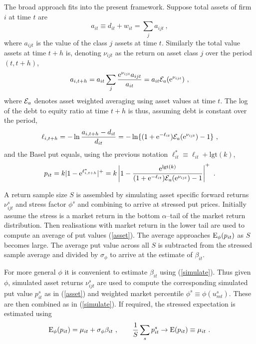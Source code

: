\documentclass[authoryear]{elsarticle}
\newcommand{\logit}{\mathrm{lgt}}
\newcommand{\E}{\mathrm{E}}
\newcommand{\e}{\mathrm{e}}
\newcommand{\Ex}{{\cal E}}
\newcommand{\eref}[1]{(\ref{#1})}
\newcommand{\cq}{\ , \qquad}
\newcommand{\be}[1]{\begin{equation}\label{#1}}
\newcommand{\ee}{\end{equation}}
\begin{document}
The broad approach fits into the present framework.   Suppose total assets of firm $i$ at time $t$ are
$$
a_{it}\equiv d_{it}+w_{it}  = \sum_j a_{ijt} \ ,
$$
where  $a_{ijt}$ is the value of the class  $j$ assets at time $t$.   Similarly the total value assets at time $t+h$ is, denoting $\nu_{ijt}$ as the return on asset class $j$ over the period $(t,t+h)$, 
$$
 a_{i,t+h} = a_{it}\sum_j \frac{\e^{\nu_{ijt}}a_{ijt}}{a_{it}} = a_{it}\Ex_a(\e^{\nu_{ijt}})\ ,
$$
where $\Ex_a$ denotes asset weighted averaging using asset values at time $t$.
The log of the debt to equity ratio at time $t+h$ is thus, assuming debt is constant over the period,
$$
\ell_{i,t+h} = -\ln \frac{a_{i,t+h}-d_{it}}{d_{it}} = -\ln\{(1+\e^{-\ell_{it}})\Ex_a(\e^{\nu_{ijt}})-1\}\ ,
$$
and the Basel put equals, using the previous notation $\ell_{it}^*\equiv\ell_{it}+\logit(k)$,
\be{asset}
p_{it} = k|1-\e^{\ell^*_{i,t+h}}|^+ = k\left|1-\frac{\e^{\logit(k)}}{(1+\e^{-\ell_{it}})\Ex_a(\e^{\nu_{ijt}})-1}\right|^+ \ .
\ee

A return sample size $S$ is assembled by simulating asset specific forward returns $\nu^s_{ijt}$ and  stress factor $\phi^s$ and combining to arrive at stressed put prices.   Initially assume the stress  is a market return in the bottom $\alpha$--tail of the market return  distribution.   Then realisations with market return in the lower tail  are used to compute an average  of put values \eref{asset}.  The average approaches $\Es(p_{it})$ as $S$ becomes large.   The average put value across all $S$ is  subtracted from the stressed sample average and divided by $\sigma_\phi$  to arrive at the estimate of $\beta_{it}$. 

For more general $\phi$ it is  convenient to estimate $\beta_{it}$ using \eref{simulate}.   Thus given $\phi$, simulated asset returns $\nu_{ijt}^s$ are used to compute the corresponding simulated put value $p_{it}^s$ as in \eref{asset} and weighted market percentile $\phi^s\equiv \phi(u^s_{mt})$.   These are then combined as in \eref{simulate}.   If required, the stressed expectation is estimated using 
$$
\Es(p_{it}) = \mu_{it} + \sigma_\phi\beta_{it}\cq  \frac{1}{S}\sum_s p_{it}^s\rightarrow \E(p_{it})\equiv \mu_{it}\ .
$$
\end{document}
